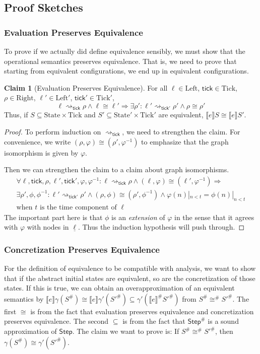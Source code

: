 \documentclass{article}
\theoremstyle{definition}
\newtheorem{clm}{Claim}[section]
\newcommand*{\Abs}[1]{{#1}^{\#}}
\newcommand*{\Left}{\text{Left}}
\newcommand*{\Right}{\text{Right}}
\newcommand*{\State}{\text{State}}
\newcommand*{\Tick}{\text{Tick}}
\newcommand*{\Step}{\mathsf{Step}}
\newcommand*{\semarrow}{\rightsquigarrow}
\newcommand*{\sembracket}[1]{\lBrack{#1}\rBrack}
\newcommand*{\tick}{\mathsf{tick}}
\begin{document}
\subsection{Proof Sketches}
\subsubsection{Evaluation Preserves Equivalence}
To prove if we actually did define equivalence sensibly, we must show that the operational semantics preserves equivalence.
That is, we need to prove that starting from equivalent configurations, we end up in equivalent configurations.
\begin{clm}[Evaluation Preserves Equivalence]
  For all $\ell\in\Left$, $\tick\in\Tick$, $\rho\in\Right$, $\ell'\in\Left'$, $\tick'\in\Tick'$,
  \[\ell\semarrow_{\tick}\rho\wedge\ell\cong\ell'\Rightarrow\exists\rho':\ell'\semarrow_{\tick'}\rho'\wedge\rho\cong\rho'\]
  Thus, if $S\subseteq\State\times\Tick$ and $S'\subseteq\State'\times\Tick'$ are equivalent, $\sembracket{e}S\cong\sembracket{e}S'$.
\end{clm}
\begin{proof}
  To perform induction on $\semarrow_\tick$, we need to strengthen the claim.
  For convenience, we write $(\rho,\varphi)\cong(\rho',\varphi^{-1})$ to emphasize that the graph isomorphism is given by $\varphi$.

  Then we can strengthen the claim to a claim about graph isomorphisms.
  \[
    \begin{array}{l}
      \forall\ell,\tick,\rho,\ell',\tick',\varphi,\varphi^{-1}:\ell\semarrow_{\tick}\rho\wedge(\ell,\varphi)\cong(\ell',\varphi^{-1})\Rightarrow \\
      \exists\rho',\phi,\phi^{-1}:\ell'\semarrow_{\tick'}\rho'\wedge(\rho,\phi)\cong(\rho',\phi^{-1})\wedge\varphi(n)|_{n<t}=\phi(n)|_{n<t}\\
      \text{when }t\text{ is the time component of }\ell
    \end{array}
  \]
  The important part here is that $\phi$ is an \emph{extension} of $\varphi$ in the sense that it agrees with $\varphi$ with nodes in $\underline{\ell}$.
  Thus the induction hypothesis will push through.
\end{proof}

\subsubsection{Concretization Preserves Equivalence}
For the definition of equivalence to be compatible with analysis, we want to show that if the abstract initial states are equivalent, so are the concretization of those states.
If this is true, we can obtain an overapproximation of an equivalent semantics by $\sembracket{e}\gamma(\Abs{S})\cong\sembracket{e}\gamma'(\Abs{S'})\subseteq\gamma'(\Abs{\sembracket{e}}\Abs{S'})$ from $\Abs{S}\Abs\cong\Abs{S'}$.
The first $\cong$ is from the fact that evaluation preserves equivalence and concretization preserves equivalence.
The second $\subseteq$ is from the fact that $\Abs\Step$ is a sound approximation of $\Step$.
The claim we want to prove is: If $\Abs{S}\Abs\cong\Abs{S'}$, then $\gamma(\Abs{S})\cong\gamma'(\Abs{S'})$.
\end{document}
